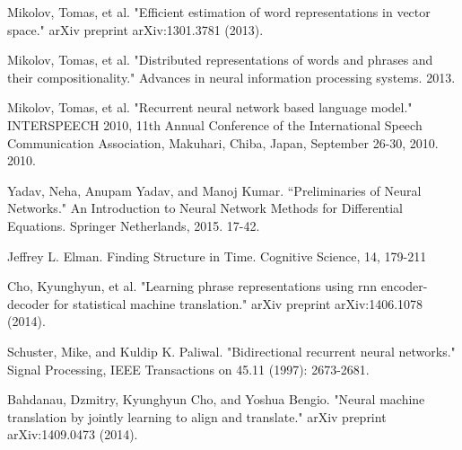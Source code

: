 \documentclass[12pt]{report}
\begin{document}
 
 


\begin{thebibliography}{11}


Mikolov, Tomas, et al. 
\newblock "Efficient estimation of word representations in vector space." 
\newblock arXiv preprint arXiv:1301.3781 (2013).

Mikolov, Tomas, et al. 
\newblock "Distributed representations of words and phrases and their compositionality." 
\newblock Advances in neural information processing systems. 2013.

Mikolov, Tomas, et al. 
\newblock "Recurrent neural network based language model." 
\newblock INTERSPEECH 2010, 11th Annual Conference of the International Speech Communication Association, Makuhari, Chiba, Japan, September 26-30, 2010. 2010.
  
Yadav, Neha, Anupam Yadav, and Manoj Kumar. 
\newblock ``Preliminaries of Neural Networks." An Introduction to Neural Network Methods for Differential Equations. 
\newblock Springer Netherlands, 2015. 17-42.

Jeffrey L. Elman. 
\newblock Finding Structure in Time. 
\newblock Cognitive Science, 14, 179-211

Cho, Kyunghyun, et al. 
\newblock "Learning phrase representations using rnn encoder-decoder for statistical machine translation." 
\newblock arXiv preprint arXiv:1406.1078 (2014).

Schuster, Mike, and Kuldip K. Paliwal. 
\newblock "Bidirectional recurrent neural networks." 
\newblock Signal Processing, IEEE Transactions on 45.11 (1997): 2673-2681.

Bahdanau, Dzmitry, Kyunghyun Cho, and Yoshua Bengio. 
\newblock "Neural machine translation by jointly learning to align and translate."
\newblock arXiv preprint arXiv:1409.0473 (2014).



\end{thebibliography}
\end{document}
